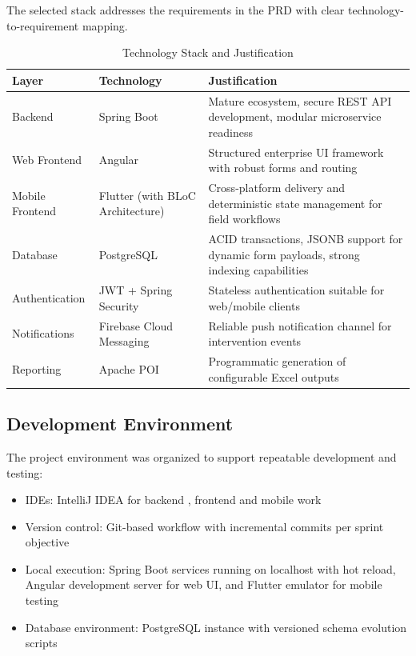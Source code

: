The selected stack addresses the requirements in the PRD with clear technology-to-requirement mapping.

\begin{table}[H]
\centering
\caption{Technology Stack and Justification}
\label{tab:stack_justification}
\begin{tabularx}{\textwidth}{|l|l|X|}
\hline
\textbf{Layer} & \textbf{Technology} & \textbf{Justification} \\
\hline
Backend & Spring Boot & Mature ecosystem, secure REST API development, modular microservice readiness \\
\hline
Web Frontend & Angular & Structured enterprise UI framework with robust forms and routing \\
\hline
Mobile Frontend & Flutter (with BLoC Architecture)  & Cross-platform delivery and deterministic state management for field workflows \\
\hline
Database & PostgreSQL & ACID transactions, JSONB support for dynamic form payloads, strong indexing capabilities \\
\hline
Authentication & JWT + Spring Security & Stateless authentication suitable for web/mobile clients \\
\hline
Notifications & Firebase Cloud Messaging & Reliable push notification channel for intervention events \\
\hline
Reporting & Apache POI & Programmatic generation of configurable Excel outputs \\
\hline
\end{tabularx}
\end{table}

\subsection{Development Environment}

The project environment was organized to support repeatable development and testing:

\begin{itemize}
\item IDEs: IntelliJ IDEA for backend , frontend and mobile work
\item Version control: Git-based workflow with incremental commits per sprint objective
\item Local execution: Spring Boot services running on localhost with hot reload, Angular development server for web UI, and Flutter emulator for mobile testing
\item Database environment: PostgreSQL instance with versioned schema evolution scripts
\end{itemize}

